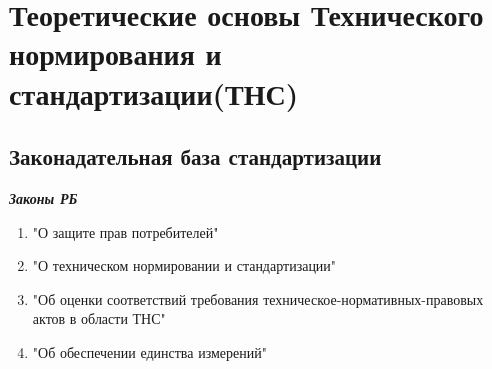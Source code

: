 \documentclass[12pt]{article}
\begin{document}
	\section{Теоретические основы Технического нормирования и стандартизации(ТНС)}
	\subsection{Законадательная база стандартизации}
	\textit{\textbf{Законы РБ}}
\begin{enumerate}
	\item "О защите прав потребителей"
	\item "О техническом нормировании и стандартизации"
	\item "Об оценки соответствий требования техническое-нормативных-правовых актов в области ТНС"
	\item "Об обеспечении единства измерений"
\end{enumerate}
\end{document}

